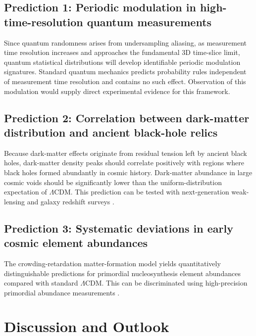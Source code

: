 \documentclass[12pt,a4paper]{article}
\begin{document}
\subsection{Prediction 1: Periodic modulation in high-time-resolution quantum measurements}
Since quantum randomness arises from undersampling aliasing, as measurement time resolution increases and approaches the fundamental 3D time-slice limit, quantum statistical distributions will develop identifiable periodic modulation signatures.
Standard quantum mechanics predicts probability rules independent of measurement time resolution and contains no such effect. Observation of this modulation would supply direct experimental evidence for this framework.

\subsection{Prediction 2: Correlation between dark-matter distribution and ancient black-hole relics}
Because dark-matter effects originate from residual tension left by ancient black holes, dark-matter density peaks should correlate positively with regions where black holes formed abundantly in cosmic history. Dark-matter abundance in large cosmic voids should be significantly lower than the uniform-distribution expectation of $\Lambda$CDM.
This prediction can be tested with next-generation weak-lensing and galaxy redshift surveys \cite{kaiser1992, des2021}.

\subsection{Prediction 3: Systematic deviations in early cosmic element abundances}
The crowding-retardation matter-formation model yields quantitatively distinguishable predictions for primordial nucleosynthesis element abundances compared with standard $\Lambda$CDM. This can be discriminated using high-precision primordial abundance measurements \cite{burbidge1957, coc2015}.

\section{Discussion and Outlook}
\end{document}
